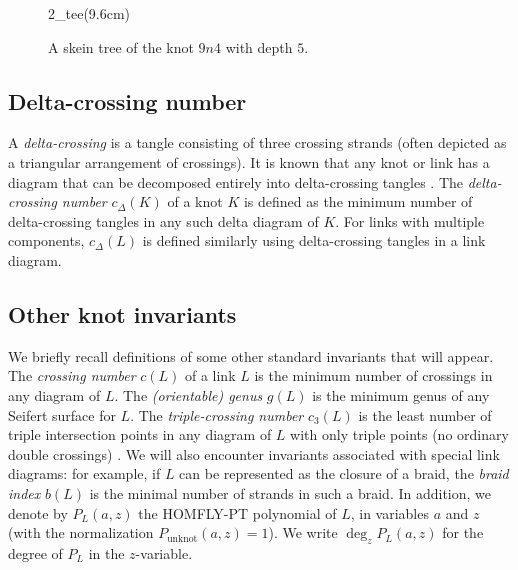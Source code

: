 \documentclass[pdftex, a4paper, 12pt, oneside]{amsart}
\numberwithin{equation}{section}
\theoremstyle{plain}
\theoremstyle{definition}
\begin{document}
	\begin{figure}[h!t]
		\begin{center}
			\begin{lpic}[]{2_tee(9.6cm)}
			\end{lpic}
			\caption{A skein tree of the knot $9n4$ with depth $5$.\label{2_tree}}
		\end{center}
	\end{figure}
	
	
	\subsection{Delta-crossing number}
	A \emph{delta-crossing} is a tangle consisting of three crossing strands (often depicted as a triangular arrangement of crossings). It is known that any knot or link has a diagram that can be decomposed entirely into delta-crossing tangles \cite{NSS15}. The \emph{delta-crossing number} $c_{\Delta}(K)$ of a knot $K$ is defined as the minimum number of delta-crossing tangles in any such delta diagram of $K$. For links with multiple components, $c_{\Delta}(L)$ is defined similarly using delta-crossing tangles in a link diagram.
	
	\subsection{Other knot invariants}
	We briefly recall definitions of some other standard invariants that will appear. The \emph{crossing number} $c(L)$ of a link $L$ is the minimum number of crossings in any diagram of $L$. The \emph{(orientable) genus} $g(L)$ is the minimum genus of any Seifert surface for $L$. The \emph{triple-crossing number} $c_3(L)$ is the least number of triple intersection points in any diagram of $L$ with only triple points (no ordinary double crossings) \cite{Ada13}. We will also encounter invariants associated with special link diagrams: for example, if $L$ can be represented as the closure of a braid, the \emph{braid index} $b(L)$ is the minimal number of strands in such a braid. In addition, we denote by $P_L(a,z)$ the HOMFLY-PT polynomial of $L$, in variables $a$ and $z$ (with the normalization $P_{\text{unknot}}(a,z)=1$). We write $\deg_z P_L(a,z)$ for the degree of $P_L$ in the $z$-variable.
	
\end{document}
